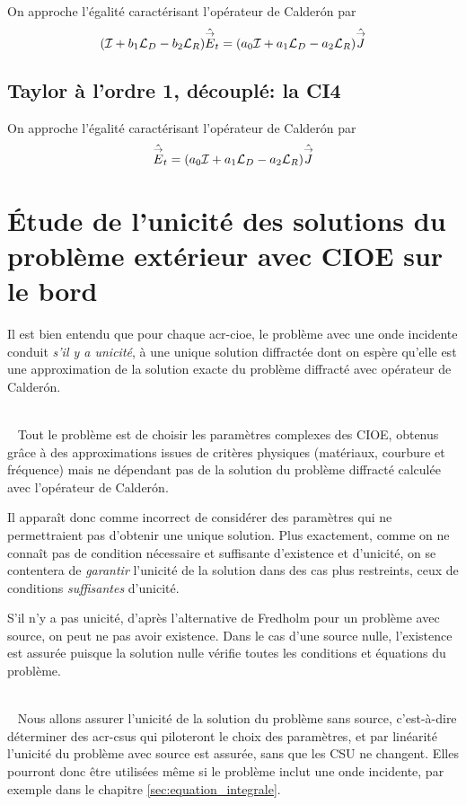     On approche l'égalité caractérisant l'opérateur de Calderón par
    \[
      ( {\mathcal{I}} + b_1 {\mathcal{L}_D} -b_2 {\mathcal{L}_R} )\hat{{\overset{\rightarrow}{E}}}_t = ( a_0{\mathcal{I}} + a_1 {\mathcal{L}_D} -a_2 {\mathcal{L}_R}) \hat {{\overset{\rightarrow}{J}}}
    \]

  \subsection{Taylor à l'ordre 1, découplé: la CI4}

    On approche l'égalité caractérisant l'opérateur de Calderón par
    \[
      \hat{{\overset{\rightarrow}{E}}}_t = ( a_0{\mathcal{I}} + a_1 {\mathcal{L}_D} - a_2 {\mathcal{L}_R} ) \hat {{\overset{\rightarrow}{J}}}
    \]

\section{Étude de l'unicité des solutions du problème extérieur avec CIOE sur le bord}

  Il est bien entendu que pour chaque \gls{acr-cioe}, le problème avec une onde incidente conduit \emph{s'il y a unicité}, à une unique solution diffractée dont on espère qu'elle est une approximation de la solution exacte du problème diffracté avec opérateur de Calderón.

  {~}\\{~}
  Tout le problème est de choisir les paramètres complexes des CIOE, obtenus grâce à des approximations issues de critères physiques (matériaux, courbure et fréquence) mais ne dépendant pas de la solution du problème diffracté calculée avec l'opérateur de Calderón. 

  Il apparaît donc comme incorrect de considérer des paramètres qui ne permettraient pas d'obtenir une unique solution.
  Plus exactement, comme on ne connaît pas de condition nécessaire et suffisante d'existence et d'unicité, on se contentera de \emph{garantir} l'unicité de la solution dans des cas plus restreints, ceux de conditions \emph{suffisantes} d'unicité.

  S'il n'y a pas unicité, d'après l'alternative de Fredholm pour un problème avec source, on peut ne pas avoir existence.
  Dans le cas d'une source nulle, l'existence est assurée puisque la solution nulle vérifie toutes les conditions et équations du problème.

  {~}\\{~}
  Nous allons assurer l'unicité de la solution du problème sans source, c'est-à-dire déterminer des \glspl{acr-csu} qui piloteront le choix des paramètres, et par linéarité l'unicité du problème avec source est assurée, sans que les CSU ne changent. 
  Elles pourront donc être utilisées même si le problème inclut une onde incidente, par exemple dans le chapitre \ref{sec:equation_integrale}.

